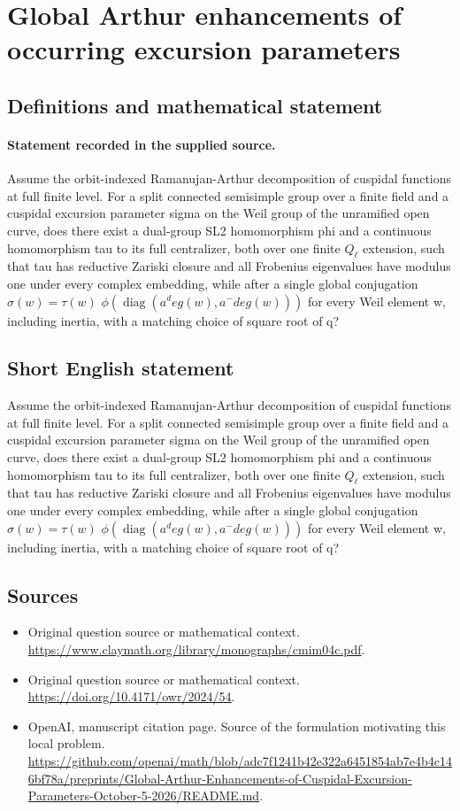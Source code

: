 \documentclass[11pt]{article}
\begin{document}
\section*{Global Arthur enhancements of occurring excursion parameters}\label{30007263}
\subsection{Definitions and mathematical statement}
\paragraph{Statement recorded in the supplied source.}
Assume the orbit-indexed Ramanujan-Arthur decomposition of cuspidal functions at full finite level. For a split connected semisimple group over a finite field and a cuspidal excursion parameter sigma on the Weil group of the unramified open curve, does there exist a dual-group SL2 homomorphism phi and a continuous homomorphism tau to its full centralizer, both over one finite $Q_\ell $ extension, such that tau has reductive Zariski closure and all Frobenius eigenvalues have modulus one under every complex embedding, while after a single global conjugation $\sigma (w)=\tau (w)$ $\phi (\operatorname{diag}(a^deg(w),a^-deg(w)))$ for every Weil element w, including inertia, with a matching choice of square root of q?
\subsection{Short English statement}
Assume the orbit-indexed Ramanujan-Arthur decomposition of cuspidal functions at full finite level. For a split connected semisimple group over a finite field and a cuspidal excursion parameter sigma on the Weil group of the unramified open curve, does there exist a dual-group SL2 homomorphism phi and a continuous homomorphism tau to its full centralizer, both over one finite $Q_\ell $ extension, such that tau has reductive Zariski closure and all Frobenius eigenvalues have modulus one under every complex embedding, while after a single global conjugation $\sigma (w)=\tau (w)$ $\phi (\operatorname{diag}(a^deg(w),a^-deg(w)))$ for every Weil element w, including inertia, with a matching choice of square root of q?
\subsection{Sources}
\begin{itemize}
\item[S1] Original question source or mathematical context.
\url{https://www.claymath.org/library/monographs/cmim04c.pdf}.
\item[S2] Original question source or mathematical context.
\url{https://doi.org/10.4171/owr/2024/54}.
\item[S3] OpenAI, manuscript citation page. Source of the formulation motivating this local problem.
\url{https://github.com/openai/math/blob/adc7f1241b42e322a6451854ab7e4b4c146bf78a/preprints/Global-Arthur-Enhancements-of-Cuspidal-Excursion-Parameters-October-5-2026/README.md}.
\end{itemize}
\end{document}
